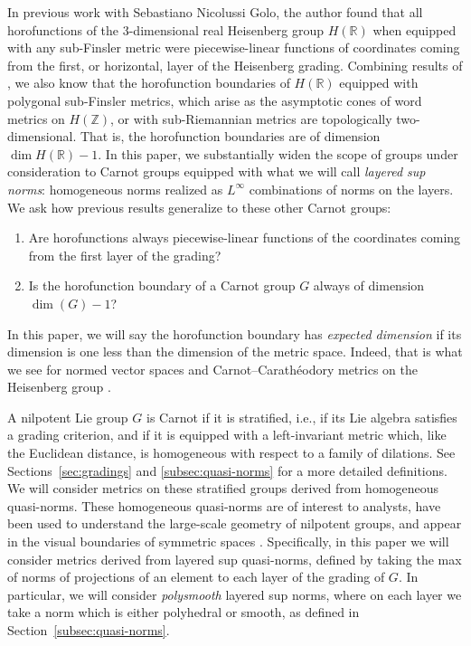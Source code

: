 \documentclass{article}
\theoremstyle{definition}
\newcommand{\HR}{H(\mathbb{R})}
\newcommand{\R}{{\mathbb R}}
\newcommand{\Z}{{\mathbb Z}}
\begin{document}
In previous work with Sebastiano Nicolussi Golo, the author found that all horofunctions of the 3-dimensional real Heisenberg group $H(\R)$ when equipped with any sub-Finsler metric were piecewise-linear functions of coordinates coming from the first, or horizontal, layer of the Heisenberg grading. Combining results of \cite{FNG, KN-cc}, we also know that the horofunction boundaries of $\HR$ equipped with polygonal sub-Finsler metrics, which arise as the asymptotic cones of word metrics on $H(\Z)$, or with sub-Riemannian metrics are topologically two-dimensional. That is, the horofunction boundaries are of dimension $\dim\HR -1$. In this paper, we substantially widen the scope of groups under consideration to Carnot groups equipped with what we will call {\em layered sup norms}: homogeneous norms realized as $L^\infty$ combinations of norms on the layers. We ask how previous results generalize to these other Carnot groups:
\begin{enumerate}
\item Are horofunctions always piecewise-linear functions of the coordinates coming from the first layer of the grading? 
\item Is the horofunction boundary of a Carnot group $G$ always of dimension $\dim(G) - 1$?
\end{enumerate}

In this paper, we will say the horofunction boundary has \emph{expected dimension} if its dimension is one less than the dimension of the metric space. Indeed, that is what we see for normed vector spaces \cite{gutierrez, ji-schilling-polyhedral, karlsson-metz, kapovich-leeb-finsler, schilling-thesis, walsh-norm} and Carnot--Carath\'eodory metrics on the Heisenberg group \cite{KN-cc, FNG}.

A nilpotent Lie group $G$ is Carnot if it is stratified, i.e., if its Lie algebra satisfies a grading criterion, and if it is equipped with a left-invariant metric which, like the Euclidean distance, is homogeneous with respect to a family of dilations. See Sections~\ref{sec:gradings} and \ref{subsec:quasi-norms} for a more detailed definitions.
We will consider metrics on these stratified groups derived from homogeneous quasi-norms. These homogeneous quasi-norms are of interest to analysts, have been used to understand the large-scale geometry of nilpotent groups, and appear in the visual boundaries of symmetric spaces \cite{breuillard-loc-cpct-gps, dymarz-fisher-xie, fischer-ruzhansky, guivarch-quasinorm}. Specifically, in this paper we will consider metrics derived from layered sup quasi-norms, defined by taking the max of norms of projections of an element to each layer of the grading of $G$. In particular, we will consider {\em polysmooth} layered sup norms, where on each layer we take a norm which is either polyhedral or smooth, as defined in Section~\ref{subsec:quasi-norms}.
\end{document}
